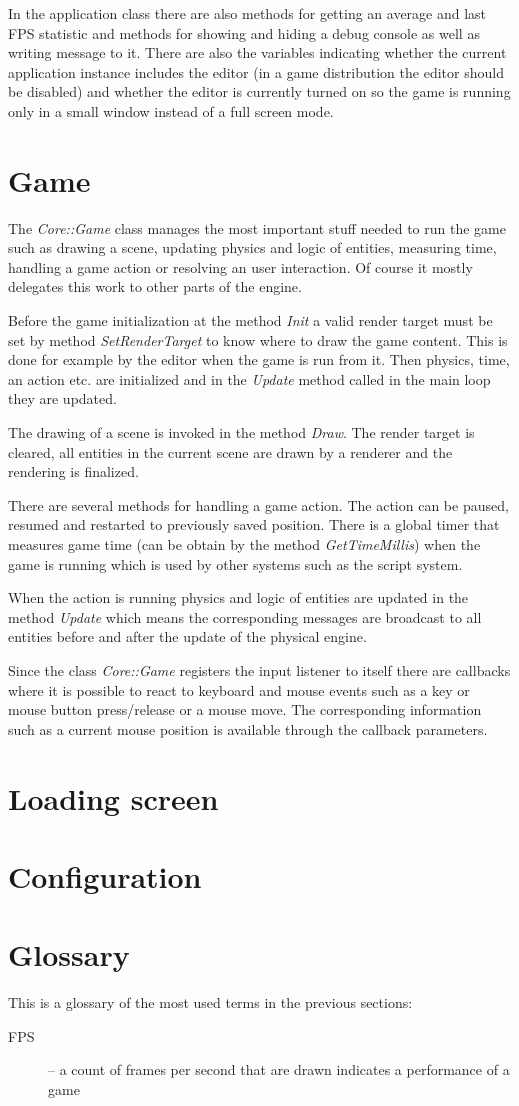 In the application class there are also methods for getting an average and last FPS statistic and methods for showing and hiding a debug console as well as writing message to it. There are also the variables indicating whether the current application instance includes the editor (in a game distribution the editor should be disabled) and whether the editor is currently turned on so the game is running only in a small window instead of a full screen mode.

\section{Game}

The \emph{Core::Game} class manages the most important stuff needed to run the game such as drawing a scene, updating physics and logic of entities, measuring time, handling a game action or resolving an user interaction. Of course it mostly delegates this work to other parts of the engine.

Before the game initialization at the method \emph{Init} a valid render target must be set by method \emph{SetRenderTarget} to know where to draw the game content. This is done for example by the editor when the game is run from it. Then physics, time, an action etc. are initialized and in the \emph{Update} method called in the main loop they are updated.

The drawing of a scene is invoked in the method \emph{Draw}. The render target is cleared, all entities in the current scene are drawn by a renderer and the rendering is finalized.

There are several methods for handling a game action. The action can be paused, resumed and restarted to previously saved position. There is a global timer that measures game time (can be obtain by the method \emph{GetTimeMillis}) when the game is running which is used by other systems such as the script system.

When the action is running physics and logic of entities are updated in the method \emph{Update} which means the corresponding messages are broadcast to all entities before and after the update of the physical engine.

Since the class \emph{Core::Game} registers the input listener to itself there are callbacks where it is possible to react to keyboard and mouse events such as a key or mouse button press/release or a mouse move. The corresponding information such as a current mouse position is available through the callback parameters.

\section{Loading screen}

\section{Configuration}
\label{sec:config}

\section{Glossary}
This is a glossary of the most used terms in the previous sections:

\begin{description}
  \item[FPS] -- a count of frames per second that are drawn indicates a performance of a game
\end{description}